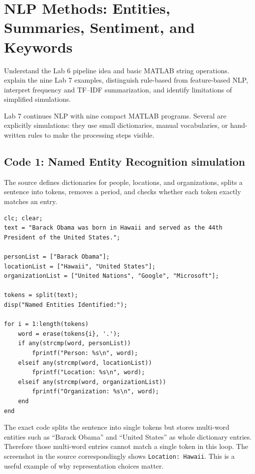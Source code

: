 \chapter{NLP Methods: Entities, Summaries, Sentiment, and Keywords}
\label{ch:nlp-methods}

\chapterguide%
  {Understand the Lab 6 pipeline idea and basic MATLAB string operations.}
  {explain the nine Lab 7 examples, distinguish rule-based from feature-based NLP, interpret frequency and TF--IDF summarization, and identify limitations of simplified simulations.}

Lab 7 continues NLP with nine compact MATLAB programs. Several are explicitly simulations: they use small dictionaries, manual vocabularies, or hand-written rules to make the processing steps visible.

\section{Code 1: Named Entity Recognition simulation}

The source defines dictionaries for people, locations, and organizations, splits a sentence into tokens, removes a period, and checks whether each token exactly matches an entry.

\begin{lstlisting}[style=mlmatlab]
clc; clear;
text = "Barack Obama was born in Hawaii and served as the 44th President of the United States.";

personList = ["Barack Obama"];
locationList = ["Hawaii", "United States"];
organizationList = ["United Nations", "Google", "Microsoft"];

tokens = split(text);
disp("Named Entities Identified:");

for i = 1:length(tokens)
    word = erase(tokens{i}, '.');
    if any(strcmp(word, personList))
        fprintf("Person: %s\n", word);
    elseif any(strcmp(word, locationList))
        fprintf("Location: %s\n", word);
    elseif any(strcmp(word, organizationList))
        fprintf("Organization: %s\n", word);
    end
end
\end{lstlisting}

\begin{pitfall}
The exact code splits the sentence into single tokens but stores multi-word entities such as ``Barack Obama'' and ``United States'' as whole dictionary entries. Therefore those multi-word entries cannot match a single token in this loop. The screenshot in the source correspondingly shows \texttt{Location: Hawaii}. This is a useful example of why representation choices matter.
\end{pitfall}

